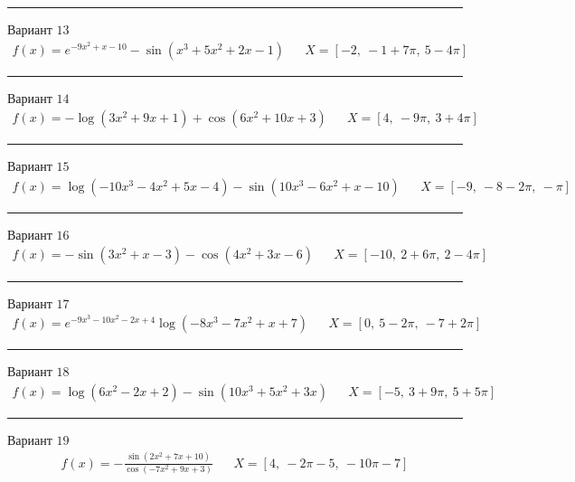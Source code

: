 \documentclass[11pt]{report}
\begin{document}
\begin{center}
    \noindent\rule{8cm}{0.4pt}
\end{center}
Вариант \(13\)
\begin{align*}
    f(x) = e^{- 9 x^{2} + x - 10} - \sin{\left(x^{3} + 5 x^{2} + 2 x - 1 \right)} && X = \left[ -2, \  -1 + 7 \pi, \  5 - 4 \pi\right]
\end{align*}
\begin{center}
    \noindent\rule{8cm}{0.4pt}
\end{center}
Вариант \(14\)
\begin{align*}
    f(x) = - \log{\left(3 x^{2} + 9 x + 1 \right)} + \cos{\left(6 x^{2} + 10 x + 3 \right)} && X = \left[ 4, \  - 9 \pi, \  3 + 4 \pi\right]
\end{align*}
\begin{center}
    \noindent\rule{8cm}{0.4pt}
\end{center}
Вариант \(15\)
\begin{align*}
    f(x) = \log{\left(- 10 x^{3} - 4 x^{2} + 5 x - 4 \right)} - \sin{\left(10 x^{3} - 6 x^{2} + x - 10 \right)} && X = \left[ -9, \  -8 - 2 \pi, \  - \pi\right]
\end{align*}
\begin{center}
    \noindent\rule{8cm}{0.4pt}
\end{center}
Вариант \(16\)
\begin{align*}
    f(x) = - \sin{\left(3 x^{2} + x - 3 \right)} - \cos{\left(4 x^{2} + 3 x - 6 \right)} && X = \left[ -10, \  2 + 6 \pi, \  2 - 4 \pi\right]
\end{align*}
\begin{center}
    \noindent\rule{8cm}{0.4pt}
\end{center}
Вариант \(17\)
\begin{align*}
    f(x) = e^{- 9 x^{3} - 10 x^{2} - 2 x + 4} \log{\left(- 8 x^{3} - 7 x^{2} + x + 7 \right)} && X = \left[ 0, \  5 - 2 \pi, \  -7 + 2 \pi\right]
\end{align*}
\begin{center}
    \noindent\rule{8cm}{0.4pt}
\end{center}
Вариант \(18\)
\begin{align*}
    f(x) = \log{\left(6 x^{2} - 2 x + 2 \right)} - \sin{\left(10 x^{3} + 5 x^{2} + 3 x \right)} && X = \left[ -5, \  3 + 9 \pi, \  5 + 5 \pi\right]
\end{align*}
\begin{center}
    \noindent\rule{8cm}{0.4pt}
\end{center}
Вариант \(19\)
\begin{align*}
    f(x) = - \frac{\sin{\left(2 x^{2} + 7 x + 10 \right)}}{\cos{\left(- 7 x^{2} + 9 x + 3 \right)}} && X = \left[ 4, \  - 2 \pi - 5, \  - 10 \pi - 7\right]
\end{align*}
\end{document}
